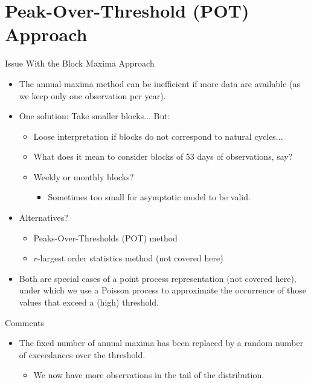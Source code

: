 \documentclass[10pt, hyperref={colorlinks = true,linkcolor = blue}]{beamer}
\begin{document}
{
\section{Peak-Over-Threshold (POT) Approach}
\begin{frame}{Issue With the Block Maxima Approach}
\begin{itemize}
    \item The annual maxima method can be inefficient if more data are available (as we keep only one observation per year).

    \item One solution: Take smaller blocks... But:
    \begin{itemize}
        \item Loose interpretation if blocks do not correspond to natural cycles...
        \item What does it mean to consider blocks of 53 days of observations, say?
        \item Weekly or monthly blocks?
        \begin{itemize}
            \item Sometimes too small for asymptotic model to be valid.
        \end{itemize}
    \end{itemize}

    \item Alternatives?
    \begin{itemize}
        \item Peaks-Over-Thresholds (POT) method
        \item \(r\)-largest order statistics method (not covered here)
    \end{itemize}

    \item Both are special cases of a point process representation (not covered here), under which we use a Poisson process to approximate the occurrence of those values that exceed a (high) threshold.
\end{itemize}

\end{frame}

\begin{frame}{Comments}
\begin{itemize}
    \item The fixed number of annual maxima has been replaced by a random number of exceedances over the threshold.
    \begin{itemize}
        \item We now have more observations in the tail of the distribution.
    \end{itemize}


\end{itemize}
\end{frame}}
\end{document}
